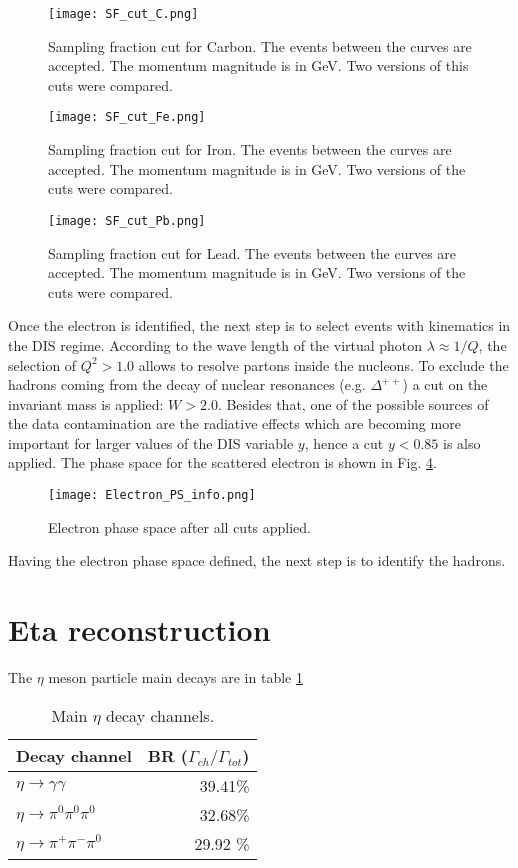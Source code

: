 \begin{figure}[!ht]
\centering
\texttt{[image: SF\_cut\_C.png]}
\caption{Sampling fraction cut for Carbon. The events between the curves are accepted. The momentum magnitude is in GeV. Two versions of this cuts were compared.}
\label{fig:sf_e_C}
\end{figure}
%
\begin{figure}[!ht]
\centering
\texttt{[image: SF\_cut\_Fe.png]}
\caption{Sampling fraction cut for Iron. The events between the curves are accepted. The momentum magnitude is in GeV. Two versions of the cuts were compared.}
\label{fig:sf_e_Fe}
\end{figure}
%
\begin{figure}[!ht]
\centering
\texttt{[image: SF\_cut\_Pb.png]}
\caption{Sampling fraction cut for Lead. The events between the curves are accepted. The momentum magnitude is in GeV. Two versions of the cuts were compared.}
\label{fig:sf_e_Pb}
\end{figure}
%
Once the electron is identified, the next step is to select events with kinematics in the DIS regime. According to the wave length of the virtual photon $\lambda \approx 1/Q$, the selection of $Q^2>1.0$ allows to resolve partons inside the nucleons. To exclude the hadrons  coming from the decay of nuclear resonances (e.g. $\Delta ^{++}$) a cut on the invariant mass is applied: $W>2.0$. Besides that, one of the possible sources of the data contamination are the  radiative effects which are becoming more important for larger values of the DIS variable $y$, hence a cut $y<0.85$ is also applied. The phase space for the scattered electron is shown in Fig. \ref{fig:e_PS}.
%   
\begin{figure}[!ht]
\centering
\texttt{[image: Electron\_PS\_info.png]}
\caption{Electron phase space after all cuts applied.}
\label{fig:e_PS}
\end{figure}
%
Having the electron phase space defined, the next step is to identify the hadrons. 
\clearpage
\section{Eta reconstruction}
The $\eta$ meson particle main decays are in table \ref{tb:eta_BR}
%
\begin{table}
\centering
\begin{tabular}{|l|r|}
\hline
Decay channel & BR ($\Gamma_{ch}/\Gamma_{tot}$)\\ \hline
$\eta \rightarrow \gamma\gamma$ & 39.41\%\\ \hline
$\eta \rightarrow \pi^0\pi^0\pi^0$ & 32.68\%\\ \hline
$\eta \rightarrow \pi^+\pi^-\pi^0$ & 29.92 \% \\ \hline
\end{tabular}
\caption{Main $\eta$ decay channels.}
\label{tb:eta_BR}
\end{table}
%

